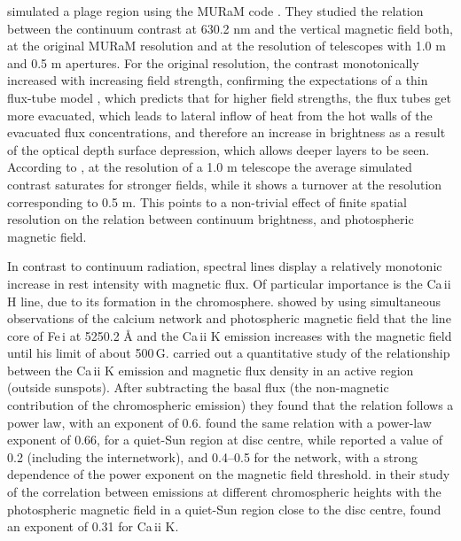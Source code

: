\documentclass[goettingen, gauss, print]{thesis}
\begin{document}
\cite{rohrbein_is_2011} simulated a plage region using the MURaM code \citep{vogler_simulations_2005}. They studied the relation between the continuum contrast at 630.2 nm and the vertical magnetic field both, at the original MURaM resolution and at the resolution of telescopes with 1.0 m and 0.5 m apertures. For the original resolution, the contrast monotonically increased with increasing field strength, confirming the expectations of a thin flux-tube model \citep{spruit_pressure_1976}, which predicts that for higher field strengths, the flux tubes get more evacuated, which leads to lateral inflow of heat from the hot walls of the evacuated flux concentrations, and therefore an increase in brightness as a result of the optical depth surface depression, which allows deeper layers to be seen. According to \cite{rohrbein_is_2011}, at the resolution of a  1.0 m telescope the average simulated contrast saturates for stronger fields, while it shows a turnover at the resolution corresponding to 0.5 m. This points to a non-trivial effect of finite spatial resolution on the relation between continuum brightness, and photospheric magnetic field.

In contrast to continuum radiation, spectral lines display a relatively monotonic increase in rest intensity with magnetic flux. Of particular importance is the Ca\,{\sc ii} H line, due to its formation in the chromosphere. \cite{frazier_multi-channel_1971} showed by using simultaneous observations of the calcium network and photospheric magnetic field that the line core of Fe\,{\sc i} at 5250.2 \AA{} and the Ca\,{\sc ii} K emission increases with the magnetic field until his limit of about 500\,G. \cite{schrijver_relations_1989} carried out a quantitative study of the relationship between the Ca\,{\sc ii} K emission and magnetic flux density in an active region (outside sunspots). After subtracting the basal flux (the non-magnetic contribution of the chromospheric emission) they found that the relation follows a power law, with an exponent of 0.6.
\cite{ortiz_how_2005} found the same relation with a power-law exponent of 0.66, for a quiet-Sun region at disc centre, while \cite{rezaei_relation_2007} reported a value of 0.2 (including the internetwork), and 0.4--0.5 for the network, with a strong dependence of the power exponent on the magnetic field threshold.
\cite{loukitcheva_relationship_2009} in their study of the correlation between emissions at different chromospheric heights with the photospheric magnetic field in a quiet-Sun region close to the disc centre, found an exponent of 0.31 for Ca\,{\sc ii} K.
\end{document}
